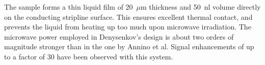 The  sample
forms a thin liquid film of 20~$\mu$m thickness and 50~nl volume directly
on the conducting stripline surface. This ensures excellent thermal
contact, and prevents the liquid from heating up too much upon microwave
irradiation. The microwave power employed in Denysenkov's design is
about two orders of magnitude stronger than in the one by Annino et al.
Signal enhancements of up to a factor of 30 have been observed with this
system.
